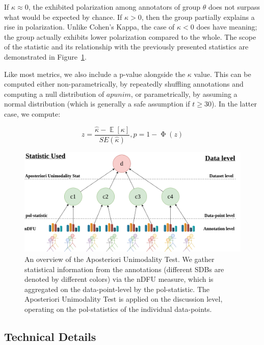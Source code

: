 \documentclass[twocolumn, 8pt]{article}
\begin{document}
If $\kappa \approx 0$, the exhibited polarization among annotators of group $\theta$ does not surpass what would be expected by chance. If $\kappa > 0$, then the group partially explains a rise in polarization. Unlike Cohen's Kappa, the case of $\kappa < 0$ does have meaning; the group actually exhibits lower polarization compared to the whole. The scope of the statistic and its relationship with the previously presented statistics are demonstrated in Figure~\ref{fig::overview}. 

Like most metrics, we also include a p-value alongside the $\kappa$ value. This can be computed either non-parametrically, by repeatedly shuffling annotations and computing a null distribution of $apunim$, or parametrically, by assuming a normal distribution (which is generally a safe assumption if $t \geq 30$). %
In the latter case, we compute:
 
\begin{equation}
	z = \frac{\hat{\kappa}  - \mathop{\mathbb{E}}[\kappa]}{SE(\hat{\kappa})}, p = 1 - \mathop{\Phi}(z)
\end{equation}

\begin{figure}
	\includegraphics[width=\linewidth]{overview.png}
	\caption{An overview of the Aposteriori Unimodality Test. We gather statistical information from the annotations (different \acp{SDB} are denoted by different colors) via the \ac{nDFU} measure, which is aggregated on the data-point-level by the pol-statistic. The Aposteriori Unimodality Test is applied on the discussion level, operating on the pol-statistics of the individual data-points.}
	\label{fig::overview}
\end{figure}


\subsection{Technical Details}
\label{ssec:methodology:details}
\end{document}
